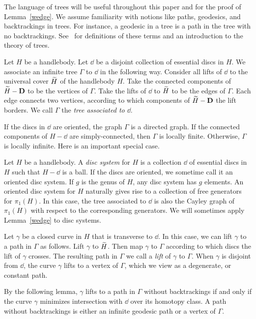 The language of trees will be useful throughout this paper and for the proof of Lemma~\ref{wedge}.  We assume familiarity with notions like paths, geodesics, and backtrackings in trees.  For instance, a geodesic in a tree is a path in the tree with no backtrackings.  See~\cite[Ch. I.2]{Se} for definitions of these terms and an introduction to the theory of trees.

Let $H$ be a handlebody.  Let $\dd$ be a disjoint collection of essential discs in $H$.  We associate an infinite tree $\Gamma$ to $\dd$ in the following way.  Consider all lifts of $\dd$ to the universal cover $\widetilde{H}$ of the handlebody $H$.  Take the connected components of $\widetilde{H}-\mathbf{D}$ to be the vertices of $\Gamma$.  Take the lifts of $\dd$ to $\widetilde{H}$ to be the edges of $\Gamma$.  Each edge connects two vertices, according to which components of $\widetilde{H}-\mathbf{D}$ the lift borders.  We call $\Gamma$ the \emph{tree associated to $\dd$}.

If the discs in $\dd$ are oriented, the graph $\Gamma$ is a directed graph.  If the connected components of $H-\dd$ are simply-connected, then $\Gamma$ is locally finite.  Otherwise, $\Gamma$ is locally infinite.  Here is an important special case.

Let $H$ be a handlebody.  A \emph{disc system} for $H$ is a collection $\dd$ of essential discs in $H$ such that $H-\dd$ is a ball.  If the discs are oriented, we sometime call it an oriented disc system.  If $g$ is the genus of $H$, any disc system has $g$ elements.  An oriented disc system for $H$ naturally gives rise to a collection of free generators for $\pi_{1}(H)$.  In this case, the tree associated to $\dd$ is also the Cayley graph of $\pi_{1}(H)$ with respect to the corresponding generators.  We will sometimes apply Lemma~\ref{wedge} to disc systems.

Let $\gamma$ be a closed curve in $H$ that is transverse to $\dd$.  In this case, we can lift $\gamma$ to a path in $\Gamma$ as follows.  Lift $\gamma$ to $\widetilde{H}$.  Then map $\gamma$ to $\Gamma$ according to which discs the lift of $\gamma$ crosses.  The resulting path in $\Gamma$ we call a \emph{lift} of $\gamma$ to $\Gamma$.  When $\gamma$ is disjoint from $\dd$, the curve $\gamma$ lifts to a vertex of $\Gamma$, which we view as a degenerate, or constant path.

By the following lemma, $\gamma$ lifts to a path in $\Gamma$ without backtrackings if and only if the curve $\gamma$ minimizes intersection with $\dd$ over its homotopy class.  A path without backtrackings is either an infinite geodesic path or a vertex of $\Gamma$.


